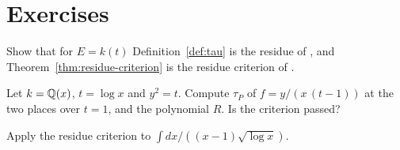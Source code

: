 \section*{Exercises}

\begin{exercise}
Show that for $E = k(t)$ Definition~\ref{def:tau} is the residue of
, and Theorem~\ref{thm:residue-criterion} is the residue
criterion of .
\end{exercise}

\begin{exercise}
Let $k = \mathbb{Q}(x)$, $t = \log x$ and $y^2 = t$. Compute $\tau_P$ of $f = y/(x\,(t
- 1))$ at the two places over $t = 1$, and the polynomial $R$. Is the
criterion passed?
\end{exercise}

\begin{exercise}
Apply the residue criterion to $\int dx / ((x - 1)\sqrt{\log x})$.
\end{exercise}
